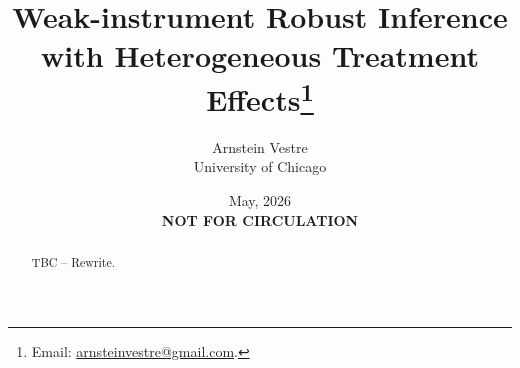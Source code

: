 \documentclass[a4paper, article, english, oneside, unknownkeysallowed, 12pt]{memoir}
\title{
Weak-instrument Robust Inference with Heterogeneous Treatment Effects\thanks{Email: \href{mailto:arnsteinvestre@gmail.com}{arnsteinvestre@gmail.com}.}}
\author{
Arnstein Vestre \\[-4pt] 
{\small University of Chicago} \\
}
\date{May, 2026 \\[8pt] {\small\textbf{NOT FOR CIRCULATION}} \vspace{-22pt}
} %
\begin{document}

\maketitle


\begin{bibunit}

\begin{abstract}
\noindent
TBC -- Rewrite.


\end{abstract}



\clearpage


\clearpage


\clearpage


\clearpage


\clearpage


% 

\clearpage


\clearpage

\putbib

\end{bibunit}

\clearpage

\begin{bibunit}


\appendix 
\renewcommand\thesection{\Alph{section}}
\renewcommand\thesubsubsection{\Alph{section}.\arabic{subsection}.\roman{subsubsection}}


\renewcommand\thesection{\Alph{section}}



\clearpage

\putbib

\end{bibunit}
\end{document}
